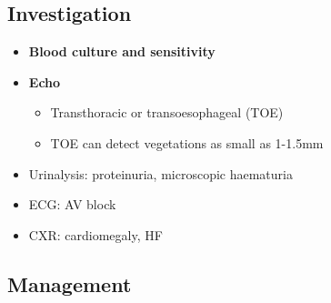 \documentclass[
  12pt,
]{memoir}
\providecommand{\tightlist}{%
  \setlength{\itemsep}{0pt}\setlength{\parskip}{0pt}}
\begin{document}
\hypertarget{investigation-14}{%
\subsection{Investigation}\label{investigation-14}}

\begin{itemize}
\tightlist
\item
  \textbf{Blood culture and sensitivity}
\item
  \textbf{Echo}

  \begin{itemize}
  \tightlist
  \item
    Transthoracic or transoesophageal (TOE)
  \item
    TOE can detect vegetations as small as 1-1.5mm
  \end{itemize}
\item
  Urinalysis: proteinuria, microscopic haematuria
\item
  ECG: AV block
\item
  CXR: cardiomegaly, HF
\end{itemize}

\hypertarget{management-12}{%
\subsection{Management}\label{management-12}}
\end{document}
